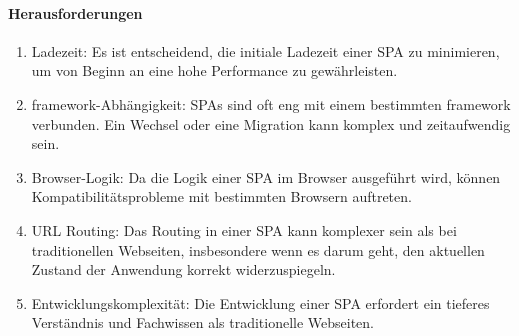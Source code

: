 \paragraph*{Herausforderungen}
\begin{enumerate}
    \item Ladezeit: Es ist entscheidend, die initiale Ladezeit einer \ac{SPA} zu minimieren, um von Beginn an eine hohe Performance zu gewährleisten.
    \item \gls{framework}-Abhängigkeit: \ac{SPA}s sind oft eng mit einem bestimmten \gls{framework} verbunden. Ein Wechsel oder eine Migration kann komplex und zeitaufwendig sein.
    \item Browser-Logik: Da die Logik einer \ac{SPA} im Browser ausgeführt wird, können Kompatibilitätsprobleme mit bestimmten Browsern auftreten.
    \item \ac{URL} Routing: Das Routing in einer \ac{SPA} kann komplexer sein als bei traditionellen Webseiten, insbesondere wenn es darum geht, den aktuellen Zustand der Anwendung korrekt widerzuspiegeln.
    \item Entwicklungskomplexität: Die Entwicklung einer \ac{SPA} erfordert ein tieferes Verständnis und Fachwissen als traditionelle Webseiten.
\end{enumerate}



